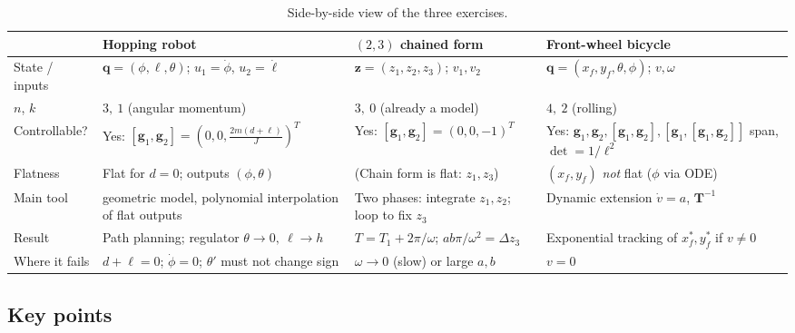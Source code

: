 \documentclass[11pt,a4paper]{article}
\theoremstyle{definition}
\theoremstyle{plain}
\theoremstyle{remark}
\newcommand{\q}{\boldsymbol{q}}
\newcommand{\g}{\boldsymbol{g}}
\newcommand{\z}{\boldsymbol{z}}
\newcommand{\Tm}{\boldsymbol{T}}
\begin{document}
\begin{table}[h]
\centering
\small
\renewcommand{\arraystretch}{1.3}
\begin{tabular}{p{2.5cm}p{3.7cm}p{4.1cm}p{4.0cm}}
\toprule
 & \textbf{Hopping robot} & \textbf{$(2,3)$ chained form} & \textbf{Front-wheel bicycle}\\
\midrule
State / inputs & $\q=(\phi,\ell,\theta)$; $u_1=\dot\phi$, $u_2=\dot\ell$ & $\z=(z_1,z_2,z_3)$; $v_1,v_2$ & $\q=(x_f,y_f,\theta,\phi)$; $v,\omega$\\
$n$, $k$ & $3,\ 1$ (angular momentum) & $3,\ 0$ (already a model) & $4,\ 2$ (rolling)\\
Controllable? & Yes: $[\g_1,\g_2]=(0,0,\tfrac{2m(d+\ell)}{J})^T$ & Yes: $[\g_1,\g_2]=(0,0,-1)^T$ & Yes: $\g_1,\g_2,[\g_1,\g_2],[\g_1,[\g_1,\g_2]]$ span, $\det=1/\ell^2$\\
Flatness & Flat for $d=0$; outputs $(\phi,\theta)$ & (Chain form is flat: $z_1,z_3$) & $(x_f,y_f)$ \emph{not} flat ($\phi$ via ODE)\\
Main tool & geometric model, polynomial interpolation of flat outputs & Two phases: integrate $z_1,z_2$; loop to fix $z_3$ & Dynamic extension $\dot v=a$, $\Tm^{-1}$\\
Result & Path planning; regulator $\theta\to0,\ \ell\to h$ & $T=T_1+2\pi/\omega$; $ab\pi/\omega^2=\Delta z_3$ & Exponential tracking of $x_f^*,y_f^*$ if $v\ne0$\\
Where it fails & $d+\ell=0$; $\dot\phi=0$; $\theta'$ must not change sign & $\omega\to0$ (slow) or large $a,b$ & $v=0$\\
\bottomrule
\end{tabular}
\caption{Side-by-side view of the three exercises.}
\end{table}

\subsection{Key points}
\end{document}
